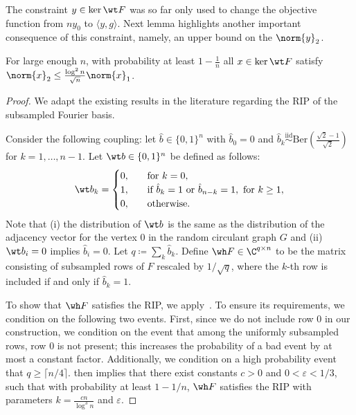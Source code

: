 The constraint \(y \in \ker \wt F\) was so far only used 
to change the objective function from \(n y_0\) to \(\langle y, g \rangle\). 
Next lemma highlights another important consequence of this constraint,
namely, an upper bound on the \(\norm{y}_2\).
\begin{lemma}
\label{lem:rip}
    For large enough $n$, with probability at least \(1 - \frac{1}{n}\) all \(x \in \ker \wt F\) satisfy \(\norm{x}_2 \leq \frac{\log^2 n}{\sqrt{n}} \norm{x}_1\).
\end{lemma}
\begin{proof}
    We adapt the existing results in the literature regarding the RIP of the subsampled Fourier basis.
    
    Consider the following coupling: let \(\hat b \in \{0, 1\}^n\) with \(\hat b_0 = 0\) and \(\hat b_k \overset{\mathrm{iid}}{\sim} \mathrm{Ber}\left(\frac{\sqrt{2} - 1}{\sqrt{2}}\right)\) for \(k = 1, \ldots, n - 1\). Let \(\wt b \in \{0, 1\}^n\) be defined as follows:
    \begin{equation}
        \wt b_k = \begin{cases}
            0, \quad &\text{for }k = 0, \\
            1, \quad &\text{if }\hat b_k = 1 \text{ or } \hat b_{n - k} = 1, \text{ for } k \geq 1, \\
            0, \quad &\text{otherwise}.
        \end{cases}
    \end{equation}
    Note that (i) the distribution of \(\wt b\) is the same as the distribution of the adjacency vector for the vertex \(0\) in the random circulant graph \(G\) and (ii) \(\wt b_i = 0\) implies \(\hat b_i = 0\). 
    Let \(q \coloneqq \sum_k \hat b_k\). 
    Define \(\wh F \in \C^{q \times n}\) to be the matrix consisting of subsampled rows of \(F\) rescaled by \(1 / \sqrt{q}\),
    where the \(k\)-th row is included if and only if \(\hat b_k = 1\). 


    To show that \(\wh F\) satisfies the RIP, we apply~. To ensure its requirements, we condition on the following two events. First, since we do not include row $0$ in our construction, we condition on the event that among the uniformly subsampled rows, row \(0\) is not present; this increases the probability of a bad event by at most a constant factor. Additionally, we condition on a high probability event that \(q \geq \lceil n / 4 \rceil\).  then implies that there exist constants \(c > 0\) and \(0 < \varepsilon < 1/3\), such that with probability at least \(1 - 1/n\), 
    \(\wh F\) satisfies the RIP with parameters \(k = \frac{c n}{\log^3 n}\) and \(\varepsilon\). 
    

\end{proof}
